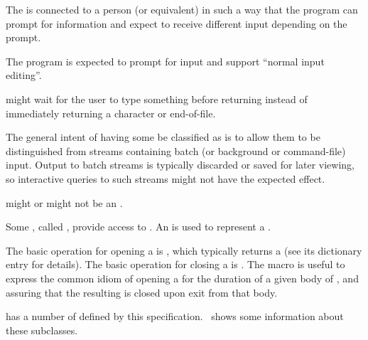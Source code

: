 \beginlist

\itemitem{\bull} 
  The  is connected to a person (or equivalent) in such a way
  that the program can prompt for information and expect to receive different
  input depending on the prompt.

\itemitem{\bull}
  The program is expected to prompt for input and support ``normal input editing''.

\itemitem{\bull} 
   might wait for the user to type something before returning
  instead of immediately returning a character or end-of-file. 

\endlist 

The general intent of having some  be classified as
 is to allow them to be distinguished from
streams containing batch (or background or command-file) input.
Output to batch streams is typically discarded or saved for later viewing, 
so interactive queries to such streams might not have the expected effect.

 might or might not be an .

\endsubsubsubsection%



Some , called , provide access to .
An   is used to represent a .

The basic operation for opening a  is ,
which typically returns a  
(see its dictionary entry for details).
The basic operation for closing a  is .
The macro  is useful 
to express the common idiom of opening a  
for the duration of a given body of , 
and assuring that the resulting  is closed upon exit from that body.

\endsubsubsubsection%


 has a number of  defined 
by this specification.  \Thenextfigure\ shows some information 
about these subclasses.

